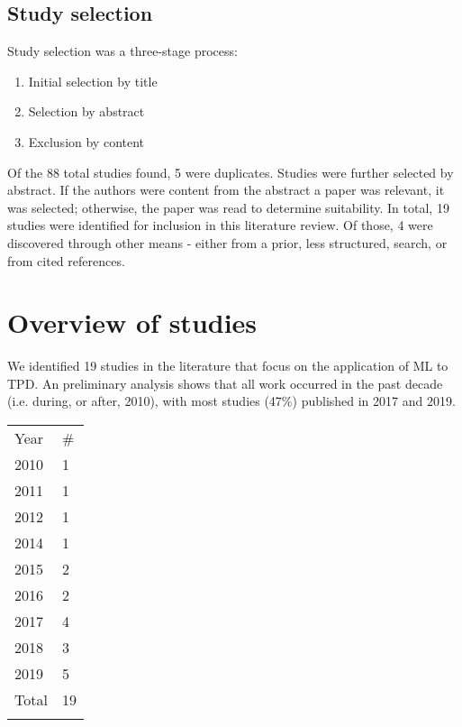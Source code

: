 \documentclass{article}
\begin{document}
\subsection{Study selection}

Study selection was a three-stage process:

\begin{enumerate}
	\item Initial selection by title
	\item Selection by abstract
	\item Exclusion by content
\end{enumerate}

Of the 88 total studies found, 5 were duplicates. Studies were further selected by abstract. If the authors were content from the abstract a paper was relevant, it was selected; otherwise, the paper was read to determine suitability. In total, 19 studies were identified for inclusion in this literature review. Of those, 4 were discovered through other means - either from a prior, less structured, search, or from cited references.

\clearpage
\section{Overview of studies}

We identified 19 studies in the literature that focus on the application of ML to TPD. An preliminary analysis shows that all work occurred in the past decade (i.e. during, or after, 2010), with most studies (47\%) published in 2017 and 2019.

\begin{table}[h]
\centering
\begin{tabular}{ll}
\noalign{\smallskip}\hline \noalign{\smallskip}
Year  & \# \\	\noalign{\smallskip}\hline \noalign{\smallskip}
2010  & 1  \\
2011  & 1  \\
2012  & 1  \\
2014 & 1	\\
2015  & 2  \\
2016  & 2  \\
2017  & 4  \\
2018  & 3  \\
2019 & 5  \\ 	\noalign{\smallskip}
Total & 19 \\  \noalign{\smallskip}\hline
\end{tabular}
\end{table}
\end{document}
